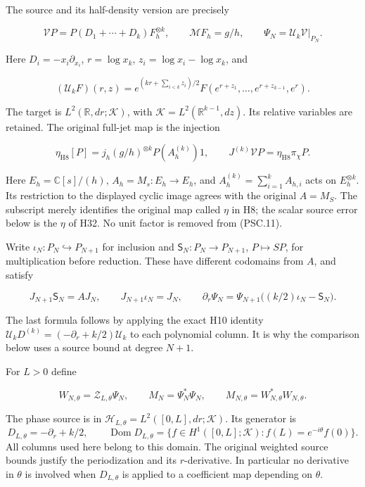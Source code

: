 The source and its half-density version are precisely

\[
 \mathcal VP=P(D_1+\cdots+D_k)F_h^{\otimes k},
 \qquad \mathcal MF_h=g/h,\qquad
 \Psi_N=\mathcal U_k\mathcal V|_{P_N}.
 \tag{PSC.10}
\]

Here \(D_i=-x_i\partial_{x_i}\),
\(r=\log x_k\), \(z_i=\log x_i-\log x_k\), and

\[
 (\mathcal U_kF)(r,z)
 =e^{(kr+\sum_{i<k}z_i)/2}
 F(e^{r+z_1},\ldots,e^{r+z_{k-1}},e^r).
\]

The target is \(L^2(\mathbb R,dr;\mathcal K)\), with
\(\mathcal K=L^2(\mathbb R^{k-1},dz)\). Its relative variables are retained. The original full-jet map is the injection

\[
 \eta_{\mathrm{H8}}[P]
 =j_h(g/h)^{\otimes k}P(A_h^{(k)})1,\qquad
 J^{(k)}\mathcal VP=\eta_{\mathrm{H8}}\pi_\chi P.
 \tag{PSC.11}
\]

Here \(E_h=\mathbb C[s]/(h)\), \(A_h=M_s:E_h\to E_h\), and \(A_h^{(k)}=\sum_{i=1}^kA_{h,i}\) acts on \(E_h^{\otimes k}\). Its restriction to the displayed cyclic image agrees with the original \(A=M_S\). The subscript merely identifies the original map called \(\eta\) in H8; the scalar source error below is the \(\eta\) of H32. No unit factor is removed from (PSC.11).

Write \(\iota_N:P_N\hookrightarrow P_{N+1}\) for inclusion and
\(\mathsf S_N:P_N\to P_{N+1}\), \(P\mapsto SP\), for multiplication before reduction. These have different codomains from \(A\), and satisfy

\[
 J_{N+1}\mathsf S_N=AJ_N,\qquad
 J_{N+1}\iota_N=J_N,\qquad
 \partial_r\Psi_N
 =\Psi_{N+1}\bigl((k/2)\iota_N-\mathsf S_N\bigr).
 \tag{PSC.12}
\]

The last formula follows by applying the exact H10 identity
\(\mathcal U_kD^{(k)}=(-\partial_r+k/2)\mathcal U_k\) to each polynomial column. It is why the comparison below uses a source bound at degree \(N+1\).

For \(L>0\) define

\[
 W_{N,\theta}=\mathcal Z_{L,\theta}\Psi_N,\qquad
 M_N=\Psi_N^*\Psi_N,\qquad
 M_{N,\theta}=W_{N,\theta}^*W_{N,\theta}.
 \tag{PSC.13}
\]

The phase source is in
\(\mathcal H_{L,\theta}=L^2([0,L],dr;\mathcal K)\).
Its generator is
\[
 D_{L,\theta}=-\partial_r+k/2,\qquad
 \operatorname{Dom}D_{L,\theta}
 =\{f\in H^1([0,L];\mathcal K):f(L)=e^{-i\theta}f(0)\}.
\]
All columns used here belong to this domain. The original weighted source bounds justify the periodization and its \(r\)-derivative. In particular no derivative in \(\theta\) is involved when \(D_{L,\theta}\) is applied to a coefficient map depending on \(\theta\).

